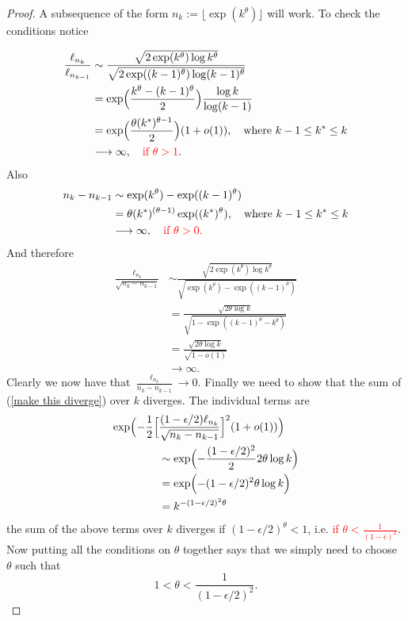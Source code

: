 \begin{proof}
A subsequence of the form $n_k := \lfloor\exp(k^\theta)\rfloor$ will work. To check the conditions notice

\begin{align*}
\frac{\ell_{n_k}}{\ell_{n_{k-1}}}
& \sim \frac{ \sqrt{2 \exp(k^\theta) \log k^\theta} }{\sqrt{2 \exp((k-1)^\theta) \log (k-1)^\theta}} \\
& =  \exp\Bigl(\frac{k^\theta - (k-1)^\theta}{2}\Bigr) \frac{\log k}{\log (k-1)}  \\
& =  \exp\Bigl(\frac{\theta(k^*)^{\theta-1}}{2}\Bigr) (1 + o(1)),\quad\text{where $k-1\leq k^*\leq k$} \\
& \longrightarrow  \infty, \quad\text{\textcolor{red}{if  $\theta > 1$}.}
\end{align*}
Also
\begin{align*}
n_k - n_{k-1} & \sim  \exp(k^\theta) - \exp((k-1)^\theta) \\
&= \theta (k^*)^{(\theta-1)} \exp((k^*)^\theta) ,\quad\text{where $k-1\leq k^*\leq k$} \\
&\longrightarrow \infty,\quad\text{\textcolor{red}{if $\theta > 0 $.}}
\end{align*}
And therefore
\begin{align*}
\frac{\ell_{n_k}}{\sqrt{n_k - n_{k-1}}}
& \sim \frac{\sqrt{2 \exp(k^\theta) \log k^\theta}}{\sqrt{ \exp(k^\theta) - \exp((k-1)^\theta) }}   \\
&  = \frac{\sqrt{2\theta\log k}}{\sqrt{ 1 - \exp((k-1)^\theta-k^\theta)  }}  \\
& = \frac{\sqrt{2\theta\log k}}{\sqrt{ 1 - o(1)  }}\\
& \longrightarrow \infty.
\end{align*}
Clearly we now have that  $\frac{\ell_{n_k}}{{n_k - n_{k-1}}}  \longrightarrow 0.$
Finally we need to show that the sum of (\ref{make this diverge}) over $k$ diverges.  The individual terms are
\begin{align*}
\exp\Bigl(-\frac{1}{2}\Bigl[&\frac{(1-\epsilon/2)\ell_{n_k}}{\sqrt{n_k - n_{k-1}}}\Bigr]^2(1+o(1))  \Bigr) \\
& \sim \exp\Bigl(-\frac{(1-\epsilon/2)^2}{2}2\theta \log k   \Bigr) \\
& = \exp\Bigl(-{(1-\epsilon/2)^2}\theta \log k   \Bigr) \\
& = k ^ {-{(1-\epsilon/2)^2}\theta}
\end{align*}
the sum of the above terms over $k$ diverges if $(1-\epsilon/2)^\theta  < 1$, i.e. \textcolor{red}{ if $\theta < \frac{1}{(1-\epsilon)^2}$}. Now putting all the  conditions on $\theta$ together says that we simply need to choose $\theta$ such that
\[ 1<\theta <\frac{1}{(1-\epsilon/2)^2} .\]
\end{proof}
